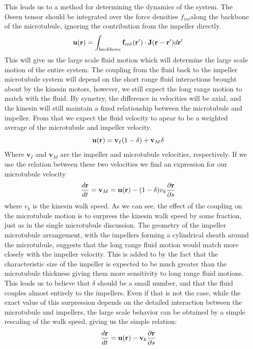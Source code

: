 \documentclass[11pt]{ucthesis}
\def\br{{\bf r}}
\begin{document}
This leads us to a method for determining the dynamics of the system. The Oseen tensor should be integrated over the force densities $f_{int}$along the backbone of the microtubule, ignoring the contribution from the impeller directly. 
\begin{equation}
\label{eq:fluidvelocity}
\mathbf{u}(\br ) = \int_{backbone} \mathbf{f}_{int}(\br^\prime) \cdot \mathbf{J} (\br - \br^\prime) d\br^\prime
\end{equation}
This will give us the large scale fluid motion which will determine the large scale motion of the entire system. The coupling from the fluid back to the impeller microtubule system will depend on the short range fluid interactions brought about by the kinesin motors, however, we still expect the long range motion to match with the fluid. By symetry, the difference in velocities will be axial, and the kinesin will still maintain a fixed relationship between the microtubule and impeller. From that we expect the fluid velocity to apear to be a weighted average of the microtubule and impeller velocity.
\begin{equation}
\label{eq:systemvelocity}
\mathbf{u}(\br) = \mathbf{v}_I(1-\delta) + \mathbf{v}_M \delta
\end{equation}
Where $\mathbf{v}_I$ and $\mathbf{v}_M$ are the impeller and microtubule velocities, respectively. If we use the relation between these two velocities we find an expression for our microtubule velocity
\begin{equation}
\label{eq:mtubevelocity}
\frac{d \br}{dt} = \mathbf{v}_M = \mathbf{u}(\br) - (1-\delta)v_k \frac{\partial \br}{\partial s}
\end{equation}
where $v_k$ is the kinesin walk speed. As we can see, the effect of the coupling on the microtubule motion is to surpress the kinesin walk speed by some fraction, just as in the single microtubule discussion. 
The geometry of the impeller microtubule arrangement, with the impellers forming a cylindrical sheath around the microtubule, suggests that the long range fluid motion would match more closely with the impeller velocity. This is added to by the fact that the characteristic size of the impeller is expected to be much greater than the microtubule thickness giving them more sensitivity to long range fluid motions.
This leads us to believe that $\delta$ should be a small number, and that the fluid couples almost entirely to the impellers.
Even if that is not the case, while the exact value of this surpression depends on the detailed interaction between the microtubule and impellers, the large scale behavior can be obtained by a simple rescaling of the walk speed, giving us the simple relation:
\begin{equation}
\label{eq:backbonevelocity}
\frac{d \br}{dt} = \mathbf{u}(\br ) - \mathbf{v}_k \frac{\partial \br}{\partial s}
\end{equation}
\end{document}
